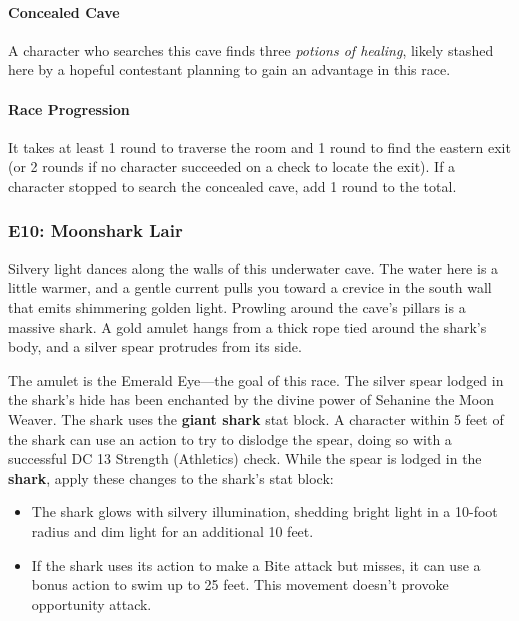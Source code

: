 \documentclass[a4paper, 11pt, bg=full, twocolumn, nooutline]{dndbook}
\begin{document}
\paragraph{Concealed Cave}

A character who searches this cave finds three \textit{potions of healing}, likely stashed here by a hopeful contestant planning to gain an advantage in this race.

\paragraph{Race Progression}

It takes at least 1 round to traverse the room and 1 round to find the eastern exit (or 2 rounds if no character succeeded on a check to locate the exit). If a character stopped to search the concealed cave, add 1 round to the total.

\subsubsection{E10: Moonshark Lair}

\begin{DndReadAloud}
Silvery light dances along the walls of this underwater cave. The water here is a little warmer, and a gentle current pulls you toward a crevice in the south wall that emits shimmering golden light. Prowling around the cave's pillars is a massive shark. A gold amulet hangs from a thick rope tied around the shark's body, and a silver spear protrudes from its side.
\end{DndReadAloud}

The amulet is the Emerald Eye---the goal of this race. The silver spear lodged in the shark's hide has been enchanted by the divine power of Sehanine the Moon Weaver. The shark uses the \textbf{giant shark} stat block. A character within 5 feet of the shark can use an action to try to dislodge the spear, doing so with a successful DC 13 Strength (Athletics) check. While the spear is lodged in the \textbf{shark}, apply these changes to the shark's stat block:

\begin{itemize}
\item The shark glows with silvery illumination, shedding bright light in a 10-foot radius and dim light for an additional 10 feet.
\item If the shark uses its action to make a Bite attack but misses, it can use a bonus action to swim up to 25 feet. This movement doesn't provoke opportunity attack.
\end{itemize}
\end{document}
